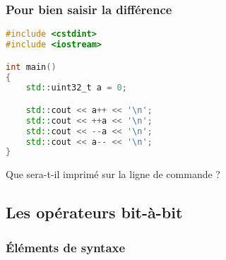 \documentclass{cppcourses}
\begin{document}
\begin{frame}[fragile]

\frametitle{Pour bien saisir la différence}

\begin{example}

\begin{lstlisting}[language = c++]
#include <cstdint>
#include <iostream>

int main()
{
    std::uint32_t a = 0;

    std::cout << a++ << '\n';
    std::cout << ++a << '\n';
    std::cout << --a << '\n';
    std::cout << a-- << '\n';
}
\end{lstlisting}

Que sera-t-il imprimé sur la ligne de commande ?


\end{example}

\end{frame}

\subsection{Les opérateurs bit-à-bit}

\subsubsection{Éléments de syntaxe}
\end{document}
